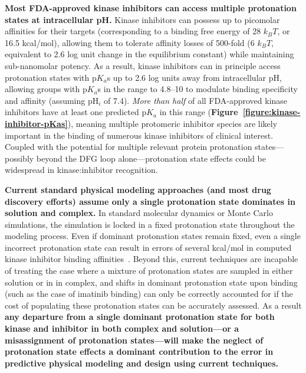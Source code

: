 \documentclass[11pt]{article}
\begin{document}
{\bf Most FDA-approved kinase inhibitors can access multiple protonation states at intracellular pH.}
Kinase inhibitors can possess up to picomolar affinities for their targets (corresponding to a binding free energy of 28 $k_B T$, or 16.5 kcal/mol), allowing them to tolerate affinity losses of 500-fold (6 $k_B T$, equivalent to 2.6 log unit change in the equilibrium constant) while maintaining sub-nanomolar potency.
As a result, kinase inhibitors can in principle access protonation states with p$K_a$s up to 2.6 log units away from intracellular pH, allowing groups with p$K_a$s in the range to 4.8--10 to modulate binding specificity and affinity (assuming pH$_i$ of 7.4).
\emph{More than half} of all FDA-approved kinase inhibitors have at least one predicted p$K_a$ in this range ({\bf Figure~\ref{figure:kinase-inhibitor-pKas}}), meaning multiple protomeric inhibitor species are likely important in the binding of numerous kinase inhibitors of clinical interest.
Coupled with the potential for multiple relevant protein protonation states---possibly beyond the DFG loop alone---protonation state effects could be widespread in kinase:inhibitor recognition.

{\bf Current standard physical modeling approaches (and most drug discovery efforts) assume only a single protonation state dominates in solution and complex.}
In standard molecular dynamics or Monte Carlo simulations, the simulation is locked in a fixed protonation state throughout the modeling process.
Even if dominant protonation states remain fixed, even a single incorrect protonation state can result in errors of several kcal/mol in computed kinase inhibitor binding affinities~\cite{simonson:j-comput-chem:2010:imatinib-protonation-state,simonson:j-biol-chem:2010:imatinib-selectivity,roux:pnas:2013:gleevec-selectivity}.
Beyond this, current techniques are incapable of treating the case where a mixture of protonation states are sampled in either solution or in in complex, and shifts in dominant protonation state upon binding (such as the case of imatinib binding) can only be correctly accounted for if the cost of populating these protonation states can be accurately assessed.
As a result {\bf any departure from a single dominant protonation state for both kinase and inhibitor in both complex and solution---or a misassignment of protonation states---will make the neglect of protonation state effects a dominant contribution to the error in predictive physical modeling and design using current techniques.}
\end{document}
